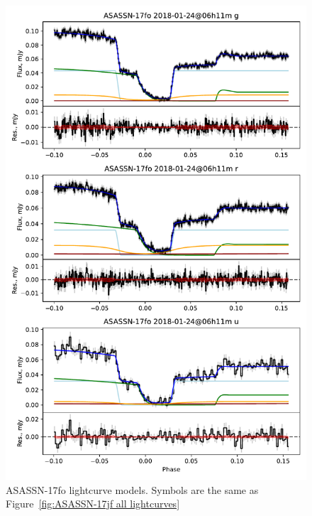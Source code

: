 \begin{figure}
    \centering
    \includegraphics[width=\textwidth]{figures/results/ASASSN-17fo/ASASSN-17fo_1.pdf}
    \caption{ASASSN-17fo lightcurve models. Symbols are the same as Figure~\ref{fig:ASASSN-17jf all lightcurves}}
    \label{fig:ASASSN-17fo all lightcurves}
\end{figure}

